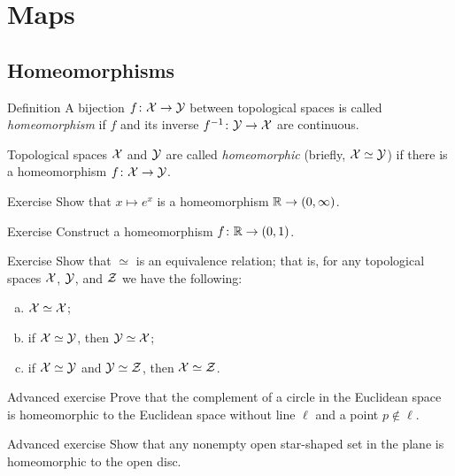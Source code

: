 \chapter{Maps}



\section{Homeomorphisms}

\begin{thm}{Definition}\label{def:cont-top}
A bijection $f\colon\mathcal{X}\to\mathcal{Y}$ between topological spaces 
is called \emph{homeomorphism} if $f$ and its inverse $f^{-1}\colon\mathcal{Y}\to\mathcal{X}$
are continuous.

Topological spaces $\mathcal{X}$ and $\mathcal{Y}$ are called \emph{homeomorphic} (briefly, $\mathcal{X}\simeq\mathcal{Y}$) if there is a homeomorphism $f\colon\mathcal{X}\to\mathcal{Y}$.
\end{thm}


\begin{thm}{Exercise}
Show that $x\mapsto e^x$ is a homeomorphism $\mathbb{R}\to (0,\infty)$.
\end{thm}

\begin{thm}{Exercise}
Construct a homeomorphism $f\colon\mathbb{R}\to (0,1)$.
\end{thm}

\begin{thm}{Exercise}
Show that $\simeq$ is an equivalence relation;
that is, for any topological spaces $\mathcal{X}$, $\mathcal{Y}$, and $\mathcal{Z}$ we have the following:
\begin{enumerate}[(a)]
 \item $\mathcal{X}\simeq\mathcal{X}$;
 \item if $\mathcal{X}\simeq\mathcal{Y}$, then $\mathcal{Y}\simeq\mathcal{X}$;
 \item if $\mathcal{X}\simeq\mathcal{Y}$ and $\mathcal{Y}\simeq\mathcal{Z}$, then $\mathcal{X}\simeq\mathcal{Z}$.
\end{enumerate}

\end{thm}

\begin{thm}{Advanced exercise}
Prove that the complement of a circle in the Euclidean space is homeomorphic to the Euclidean space without line $\ell$ and a point $p\not\in\ell$.
\end{thm}

\begin{thm}{Advanced exercise}
Show that any nonempty open star-shaped set in the plane is homeomorphic to the open disc.
\end{thm}

